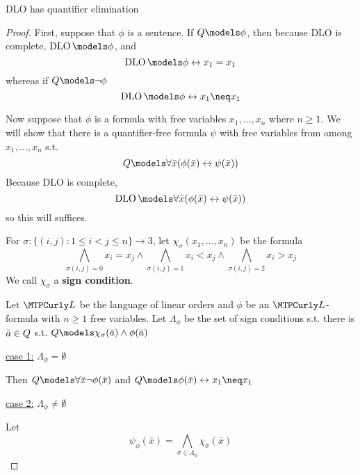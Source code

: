 \documentclass[11pt]{article}
\begin{document}
\begin{theorem}[]
DLO has quantifier elimination
\end{theorem}
\begin{proof}
First, suppose that \(\phi\) is a sentence. If \(\Q\models\phi\), then
because DLO is complete, \(\DLO\models\phi\), and 
\begin{equation*}
\DLO\models\phi\leftrightarrow x_1=x_1
\end{equation*}
whereas if \(\Q\models\neg\phi\)
\begin{equation*}
\DLO\models\phi\leftrightarrow x_1\neq x_1
\end{equation*}

Now suppose that \(\phi\) is a formula with free variables \(x_1,\dots,x_n\) where
\(n\ge1\). We will show that there is a quantifier-free formula \(\psi\) with free
variables from among \(x_1,\dots,x_n\) s.t.
\begin{equation*}
\Q\models\forall\bar{x}(\phi(\bar{x})\leftrightarrow\psi(\bar{x}))
\end{equation*}
Because DLO is complete,
\begin{equation*}
\DLO\models\forall\bar{x}(\phi(\bar{x})\leftrightarrow\psi(\bar{x}))
\end{equation*}
so this will suffices.

For \(\sigma:\{(i,j):1\le i<j\le n\}\to3\), let \(\chi_\sigma(x_1,\dots,x_n)\) be the formula
\begin{equation*}
\displaystyle\bigwedge_{\sigma(i,j)=0}x_i=x_j\wedge
\bigwedge_{\sigma(i,j)=1}x_i<x_j\wedge
\bigwedge_{\sigma(i,j)=2}x_i>x_j
\end{equation*}
We call \(\chi_\sigma\) a \textbf{sign condition}.

Let \(\call\) be the language of linear orders and \(\phi\) be an
\(\call\)-formula with \(n\ge1\) free variables. Let \(\Lambda_\phi\) be the
set of sign conditions s.t. there is \(\bar{a}\in\relax{Q}\) s.t.
\(\Q\models\chi_\sigma(\bar{a})\wedge\phi(\bar{a})\)


\uline{case 1:} \(\Lambda_\phi=\emptyset\)

Then \(\Q\models\forall\bar{x}\neg\phi(\bar{x})\) and
\(\Q\models\phi(\bar{x})\leftrightarrow x_1\neq x_1\)

\uline{case 2:} \(\Lambda_\phi\neq\emptyset\)

Let
\begin{equation*}
\psi_\phi(\bar{x})=\displaystyle\bigwedge_{\sigma\in\Lambda_\phi}\chi_\sigma(\bar{x})
\end{equation*}


\end{proof}
\end{document}
